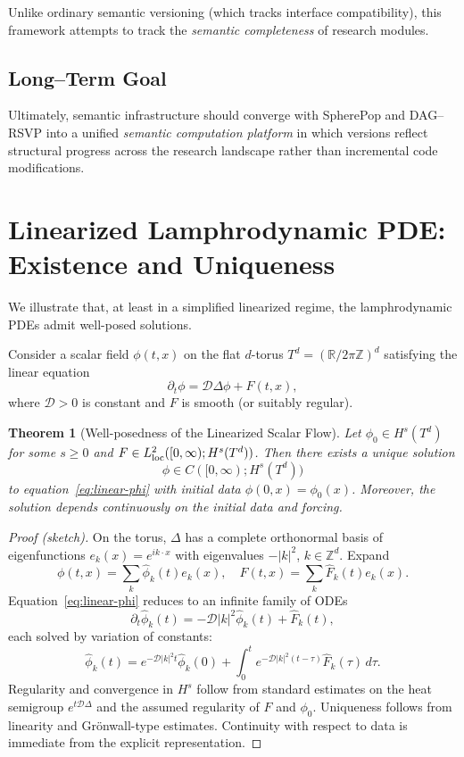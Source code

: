 \documentclass[12pt]{article}
\theoremstyle{plain}
\newtheorem{theorem}{Theorem}[section]
\theoremstyle{definition}
\theoremstyle{remark}
\begin{document}
Unlike ordinary semantic versioning (which tracks interface compatibility),
this framework attempts to track the \emph{semantic completeness} of research
modules.


\subsection{Long--Term Goal}

Ultimately, semantic infrastructure should converge with SpherePop and DAG--RSVP
into a unified \emph{semantic computation platform} in which versions reflect
structural progress across the research landscape rather than incremental code
modifications.

\newpage

\section{Linearized Lamphrodynamic PDE: Existence and Uniqueness}

We illustrate that, at least in a simplified linearized regime, the lamphrodynamic
PDEs admit well-posed solutions.

Consider a scalar field $\phi(t,x)$ on the flat $d$-torus
$T^d = (\mathbb{R}/2\pi\mathbb{Z})^d$ satisfying the linear equation
\begin{equation}
    \partial_t \phi = \mathcal{D}\Delta \phi + F(t,x),
    \label{eq:linear-phi}
\end{equation}
where $\mathcal{D}>0$ is constant and $F$ is smooth (or suitably regular). 

\begin{theorem}[Well-posedness of the Linearized Scalar Flow]
\label{thm:linear-wellposed}
Let $\phi_0 \in H^s(T^d)$ for some $s \ge 0$ and $F \in L^2_{\rm loc}([0,\infty); H^s(T^d))$. Then there exists a unique solution
\[
    \phi \in C([0,\infty); H^s(T^d))
\]
to equation~\eqref{eq:linear-phi} with initial data $\phi(0,x)=\phi_0(x)$.
Moreover, the solution depends continuously on the initial data and forcing.
\end{theorem}

\begin{proof}[Proof (sketch)]
On the torus, $\Delta$ has a complete orthonormal basis of eigenfunctions
$e_k(x) = e^{i k\cdot x}$ with eigenvalues $-|k|^2$, $k\in\mathbb{Z}^d$. Expand
\[
    \phi(t,x) = \sum_{k} \hat{\phi}_k(t) e_k(x),
    \quad
    F(t,x) = \sum_k \hat{F}_k(t) e_k(x).
\]
Equation~\eqref{eq:linear-phi} reduces to an infinite family of ODEs
\[
    \partial_t \hat{\phi}_k(t)
    = - \mathcal{D} |k|^2 \hat{\phi}_k(t) + \hat{F}_k(t),
\]
each solved by variation of constants:
\[
    \hat{\phi}_k(t)
    = e^{-\mathcal{D} |k|^2 t} \hat{\phi}_k(0)
    + \int_0^t e^{-\mathcal{D} |k|^2 (t-\tau)} \hat{F}_k(\tau)\,d\tau.
\]
Regularity and convergence in $H^s$ follow from standard estimates on the
heat semigroup $e^{t\mathcal{D}\Delta}$ and the assumed regularity of $F$ and
$\phi_0$. Uniqueness follows from linearity and Grönwall-type estimates.
Continuity with respect to data is immediate from the explicit representation.
\end{proof}
\end{document}
